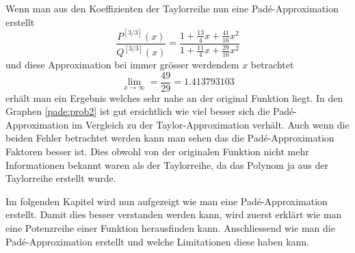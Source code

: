 Wenn man aus den Koeffizienten der Taylorreihe nun eine Padé-Approximation erstellt 
\begin{equation*}
\frac{P^{[3/3]}(x)}{Q^{[3/3]}(x)}
=
\frac{1+\frac{13}{4}x+\frac{41}{16}x^2}{1 + \frac{11}{4}x + \frac{29}{16}x^2} 
\end{equation*}
und diese Approximation bei immer grösser werdendem $x$ betrachtet
\begin{equation*}
\lim_{x \to \infty}
=
\frac{49}{29} = 1.413793103
\end{equation*}
erhält man ein Ergebnis welches sehr nahe an der original Funktion liegt. 
In den Graphen \ref{pade:prob2} ist gut ersichtlich wie viel besser sich die Padé-Approximation im Vergleich zu der Taylor-Approximation verhält.
Auch wenn die beiden Fehler betrachtet werden kann man sehen das die Padé-Approximation Faktoren besser ist.
Dies obwohl von der originalen Funktion nicht mehr Informationen bekannt waren als der Taylorreihe, da das Polynom ja aus der Taylorreihe erstellt wurde.

Im folgenden Kapitel wird nun aufgezeigt wie man eine Padé-Approximation erstellt.
Damit dies besser verstanden werden kann, wird zuerst erklärt wie man eine Potenzreihe einer Funktion herausfinden kann.
Anschliessend wie man die Padé-Approximation erstellt und welche Limitationen diese haben kann.



 


